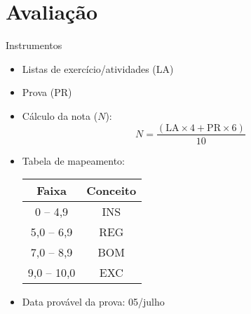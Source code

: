    \section[ slide = true ]{Avaliação}
      \begin{slide}[toc=]{Instrumentos}
         \begin{itemize}
            \item Listas de exercício/atividades (LA)
            \item Prova (PR)
            \item Cálculo da nota ($N$):
            \begin{equation*}
               N=\frac{( \text{LA} \times 4+ \text{PR} \times 6 )} {10}
            \end{equation*}
            \item Tabela de mapeamento:
            \begin{table}
               \centering
               \begin{tabular}{c|c}
                  \hline%
                  \textbf{Faixa} & \textbf{Conceito}\\
                  \hline
                  0 -- 4,9 & INS\\
                  5,0 -- 6,9 & REG\\
                  7,0 -- 8,9 & BOM\\
                  9,0 -- 10,0 & EXC\\
                  \hline%
               \end{tabular}
            \end{table}    
            \item Data provável da prova: 05/julho
           \end{itemize}
      \end{slide}
%      
